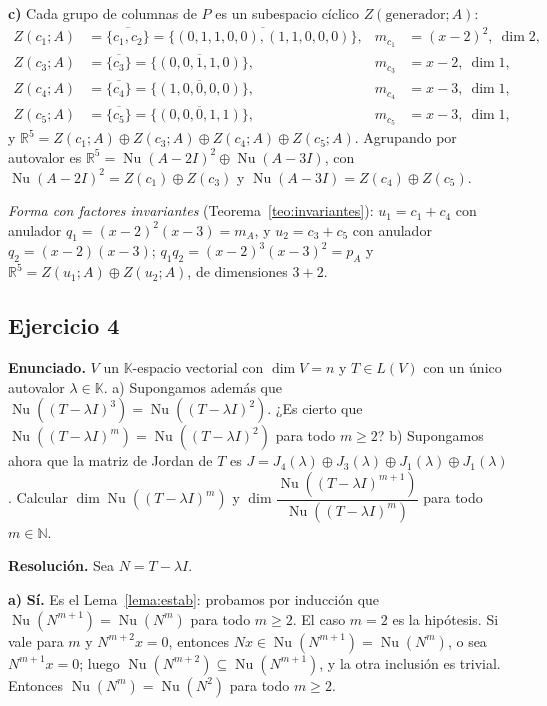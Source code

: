 \documentclass{article}
\newcommand{\R}{\mathbb{R}}
\newcommand{\K}{\mathbb{K}}
\newcommand{\gen}[1]{\overline{\{#1\}}}          %
\DeclareMathOperator{\Nu}{Nu}
\theoremstyle{plain}
\theoremstyle{definition}
\theoremstyle{remark}
\begin{document}
\textbf{c)} Cada grupo de columnas de \(P\) es un subespacio cíclico \(Z(\text{generador};A)\):
\begin{align*}
    Z(c_1;A) & =\gen{c_1,c_2}=\gen{(0,1,1,0,0),(1,1,0,0,0)}, & m_{c_1} & =(x-2)^2,\ \dim2, \\
    Z(c_3;A) & =\gen{c_3}=\gen{(0,0,1,1,0)},                 & m_{c_3} & =x-2,\ \dim1,     \\
    Z(c_4;A) & =\gen{c_4}=\gen{(1,0,0,0,0)},                 & m_{c_4} & =x-3,\ \dim1,     \\
    Z(c_5;A) & =\gen{c_5}=\gen{(0,0,0,1,1)},                 & m_{c_5} & =x-3,\ \dim1,
\end{align*}
y \(\R^5=Z(c_1;A)\oplus Z(c_3;A)\oplus Z(c_4;A)\oplus Z(c_5;A)\). Agrupando por autovalor es \(\R^5=\Nu(A-2I)^2\oplus\Nu(A-3I)\), con \(\Nu(A-2I)^2=Z(c_1)\oplus Z(c_3)\) y \(\Nu(A-3I)=Z(c_4)\oplus Z(c_5)\).

\emph{Forma con factores invariantes} (Teorema~\ref{teo:invariantes}): \(u_1=c_1+c_4\) con anulador \(q_1=(x-2)^2(x-3)=m_A\), y \(u_2=c_3+c_5\) con anulador \(q_2=(x-2)(x-3)\); \(q_1q_2=(x-2)^3(x-3)^2=p_A\) y \(\R^5=Z(u_1;A)\oplus Z(u_2;A)\), de dimensiones \(3+2\).

\subsection{Ejercicio 4}
\textbf{Enunciado.} \(V\) un \(\K\)-espacio vectorial con \(\dim V=n\) y \(T\in L(V)\) con un único autovalor \(\lambda\in\K\).
a) Supongamos además que \(\Nu((T-\lambda I)^3)=\Nu((T-\lambda I)^2)\). ¿Es cierto que \(\Nu((T-\lambda I)^m)=\Nu((T-\lambda I)^2)\) para todo \(m\ge2\)?
b) Supongamos ahora que la matriz de Jordan de \(T\) es \(J=J_4(\lambda)\oplus J_3(\lambda)\oplus J_1(\lambda)\oplus J_1(\lambda)\). Calcular \(\dim\Nu((T-\lambda I)^m)\) y \(\dim\dfrac{\Nu((T-\lambda I)^{m+1})}{\Nu((T-\lambda I)^m)}\) para todo \(m\in\mathbb N\).

\textbf{Resolución.} Sea \(N=T-\lambda I\).

\textbf{a)} \textbf{Sí.} Es el Lema~\ref{lema:estab}: probamos por inducción que \(\Nu(N^{m+1})=\Nu(N^m)\) para todo \(m\ge2\). El caso \(m=2\) es la hipótesis. Si vale para \(m\) y \(N^{m+2}x=0\), entonces \(Nx\in\Nu(N^{m+1})=\Nu(N^m)\), o sea \(N^{m+1}x=0\); luego \(\Nu(N^{m+2})\subseteq\Nu(N^{m+1})\), y la otra inclusión es trivial. Entonces \(\Nu(N^m)=\Nu(N^2)\) para todo \(m\ge2\).
\end{document}
